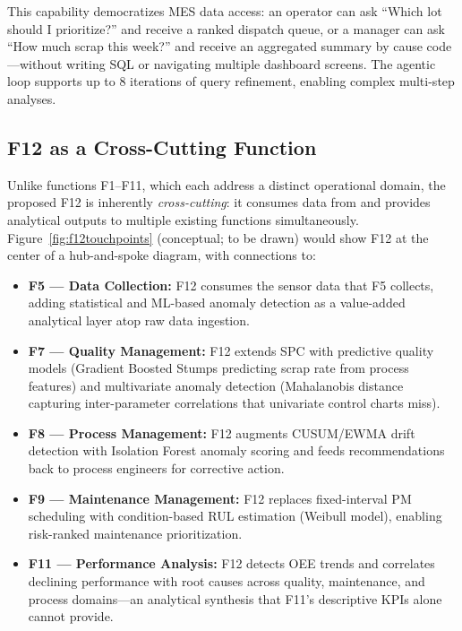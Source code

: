 This capability democratizes MES data access: an operator can ask ``Which lot
should I prioritize?'' and receive a ranked dispatch queue, or a manager can ask
``How much scrap this week?'' and receive an aggregated summary by cause
code---without writing SQL or navigating multiple dashboard screens.  The
agentic loop supports up to 8 iterations of query refinement, enabling complex
multi-step analyses.


\subsection{F12 as a Cross-Cutting Function}

Unlike functions F1--F11, which each address a distinct operational domain, the
proposed F12 is inherently \textit{cross-cutting}: it consumes data from and
provides analytical outputs to multiple existing functions simultaneously.
Figure~\ref{fig:f12touchpoints} (conceptual; to be drawn) would show F12 at the
center of a hub-and-spoke diagram, with connections to:

\begin{itemize}[leftmargin=2em, itemsep=1pt]
\item \textbf{F5 --- Data Collection:} F12 consumes the sensor data that F5
collects, adding statistical and ML-based anomaly detection as a value-added
analytical layer atop raw data ingestion.
\item \textbf{F7 --- Quality Management:} F12 extends SPC with predictive
quality models (Gradient Boosted Stumps predicting scrap rate from process
features) and multivariate anomaly detection (Mahalanobis distance capturing
inter-parameter correlations that univariate control charts miss).
\item \textbf{F8 --- Process Management:} F12 augments CUSUM/EWMA drift
detection with Isolation Forest anomaly scoring and feeds recommendations back
to process engineers for corrective action.
\item \textbf{F9 --- Maintenance Management:} F12 replaces fixed-interval PM
scheduling with condition-based RUL estimation (Weibull model), enabling
risk-ranked maintenance prioritization.
\item \textbf{F11 --- Performance Analysis:} F12 detects OEE trends and
correlates declining performance with root causes across quality, maintenance,
and process domains---an analytical synthesis that F11's descriptive KPIs alone
cannot provide.
\end{itemize}

